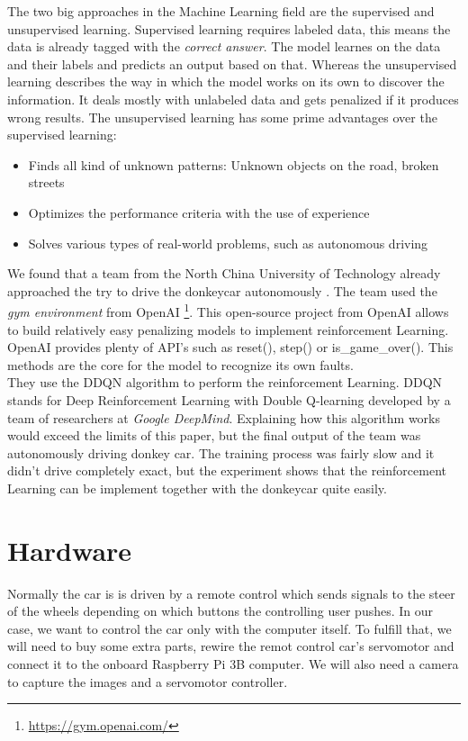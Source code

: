 \documentclass[journal]{IEEEtran}
\begin{document}
The two big approaches in the Machine Learning field are the supervised and unsupervised learning. Supervised learning requires labeled data, this means the data is already tagged with the \textit{correct answer}. The model learnes on the data and their labels and predicts an output based on that. Whereas the unsupervised learning describes the way in which the model works on its own to discover the information. It deals mostly with unlabeled data and gets penalized if it produces wrong results. The unsupervised learning has some prime advantages over the supervised learning:

\begin{itemize}
\item Finds all kind of unknown patterns: Unknown objects on the road, broken streets
\item Optimizes the performance criteria with the use of experience
\item Solves various types of real-world problems, such as autonomous driving
\end{itemize}

We found that a team from the North China University of Technology already approached the try to drive the donkeycar autonomously \cite{reinforcement}. The team used the \textit{gym environment} from OpenAI \footnote{\url{https://gym.openai.com/}}. This open-source project from OpenAI allows to build relatively easy penalizing models to implement reinforcement Learning. OpenAI provides plenty of API's such as reset(), step() or is\_game\_over(). This methods are the core for the model to recognize its own faults. \\
They use the DDQN algorithm to perform the reinforcement Learning. DDQN stands for Deep Reinforcement Learning with Double Q-learning \cite{reinforcement2} developed by a team of researchers at \textit{Google DeepMind}. Explaining how this algorithm works would exceed the limits of this paper, but the final output of the team \cite{reinforcement} was autonomously driving donkey car. The training process was fairly slow and it didn't drive completely exact, but the experiment shows that the reinforcement Learning can be implement together with the donkeycar quite easily.

\section{Hardware}

Normally the car is is driven by a remote control which sends signals to the steer of the wheels depending on which buttons the controlling user pushes. In our case, we want to control the car only with the computer itself. To fulfill that, we will need to buy some extra parts, rewire the remot control car’s servomotor and connect it to the onboard Raspberry Pi 3B computer. We will also need a camera to capture the images and a servomotor controller.
\end{document}

